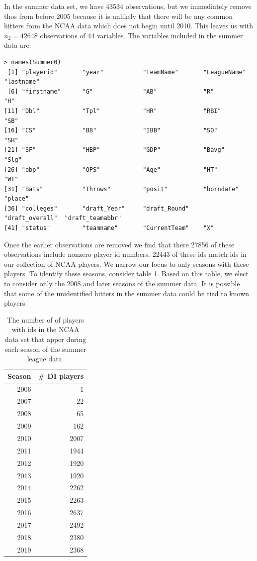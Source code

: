 \documentclass [52pt] {article}
\begin{document}
In the summer data set, we have 43534 observations, but we immediately remove thos from before 2005 because it is unlikely that there will be any common hitters from the NCAA data which does not begin until 2010.  This leaves us with $n_2 = 42648$ observations of 44 variables.  The variables included in the summer data are:
\begin{verbatim}
> names(Summer0)
 [1] "playerid"       "year"           "teamName"       "LeagueName"     "lastname"      
 [6] "firstname"      "G"              "AB"             "R"              "H"             
[11] "Dbl"            "Tpl"            "HR"             "RBI"            "SB"            
[16] "CS"             "BB"             "IBB"            "SO"             "SH"            
[21] "SF"             "HBP"            "GDP"            "Bavg"           "Slg"           
[26] "obp"            "OPS"            "Age"            "HT"             "WT"            
[31] "Bats"           "Throws"         "posit"          "borndate"       "place"         
[36] "colleges"       "draft_Year"     "draft_Round"    "draft_overall"  "draft_teamabbr"
[41] "status"         "teamname"       "CurrentTeam"    "X"  
\end{verbatim}
Once the earlier observations are removed we find that there 27856 of these observations include nonzero player id numbers.  22443 of these ids match ids in our collection of NCAA players.  We narrow our focus to only seasons with these players.  To identify these seasons, consider table \ref{tab : ncaa_to_summer}.  Based on this table, we elect to consider only the 2008 and later seasons of the summer data.  It is possible that some of the unidentified hitters in the summer data could be tied to known players.  
\begin{table}[ht]
\centering
\begin{tabular}{rr}
  \hline
Season & \# DI players \\ 
  \hline
2006 &   1 \\ 
  2007 &  22 \\ 
  2008 &  65 \\ 
  2009 & 162 \\ 
  2010 & 2007 \\ 
  2011 & 1944 \\ 
  2012 & 1920 \\ 
  2013 & 1920 \\ 
  2014 & 2262 \\ 
  2015 & 2263 \\ 
  2016 & 2637 \\ 
  2017 & 2492 \\ 
  2018 & 2380 \\ 
  2019 & 2368 \\ 
   \hline
\end{tabular}
\caption{\label{tab : ncaa_to_summer} The number of of players with ids in the NCAA data set that apper during each season of the summer league data.}
\end{table}
\end{document}
